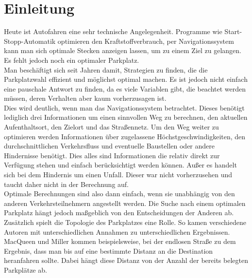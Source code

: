 \section{Einleitung}

Heute ist Autofahren eine sehr technische Angelegenheit. Programme wie Start-Stopp-Automatik optimieren den Kraftstoffverbrauch, per Navigationssystem kann man sich optimale Stecken anzeigen lassen, um zu einem Ziel zu gelangen.\\
Es fehlt jedoch noch ein optimaler Parkplatz.\\
Man beschäftigt sich seit Jahren damit, Strategien zu finden, die die Parkplatzwahl effizient und möglichst optimal machen. Es ist jedoch nicht einfach eine pauschale Antwort zu finden, da es viele Variablen gibt, die beachtet werden müssen, deren Verhalten aber kaum vorherzusagen ist.\\
Dies wird deutlich, wenn man das Navigationssystem betrachtet. Dieses benötigt lediglich drei Informationen um einen sinnvollen Weg zu berechnen, den aktuellen Aufenthaltsort, den Zielort und das Straßennetz. Um den Weg weiter zu optimieren werden Informationen über zugelassene Höchstgeschwindigkeiten, den durchschnittlichen Verkehrsfluss und eventuelle Baustellen oder andere Hindernisse benötigt. Dies alles sind Informationen die relativ direkt zur Verfügung stehen und einfach berücksichtigt werden können. Außer es handelt sich bei dem Hindernis um einen Unfall. Dieser war nicht vorherzusehen und taucht daher nicht in der Berechnung auf.\\
 Optimale Berechnungen sind also dann einfach, wenn sie unabhängig von den anderen Verkehrsteilnehmern angestellt werden. Die Suche nach einem optimalen Parkplatz hängt jedoch maßgeblich von den Entscheidungen der Anderen ab. \\
Zusätzlich spielt die Topologie des Parkplatzes eine Rolle. So kamen verschiedene Autoren mit unterschiedlichen Annahmen zu unterschiedlichen Ergebnissen. MacQueen und Miller kommen beispielsweise, bei der endlosen Straße zu dem Ergebnis, dass man bis auf eine bestimmte Distanz an die Destination heranfahren sollte. Dabei hängt diese Distanz von der Anzahl der bereits belegten Parkplätze ab.\\

